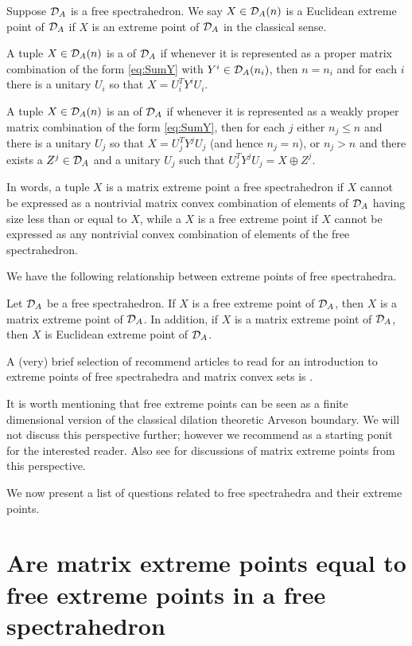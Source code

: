 Suppose $\mathcal{D}_A$ is a free spectrahedron. We say $X \in \mathcal{D}_A (n)$ is a Euclidean extreme point of $\mathcal{D}_A$ if $X$ is an extreme point of 
$\mathcal{D}_A$ in the classical sense. 

A tuple  $X \in \mathcal{D}_A(n)$  is a 
  of $\mathcal{D}_A$
 if whenever it is represented as a proper matrix combination of the form
\eqref{eq:SumY} with $Y^i \in \mathcal{D}_A(n_i)$,
then $n=n_i$ and for each $i$ there is a unitary $U_i$ so that  $X = U_i^T Y^i U_i$.

 A tuple  $X \in \mathcal{D}_A(n)$  is an    of $\mathcal{D}_A$
 if whenever it is represented as a weakly proper matrix combination of the form \eqref{eq:SumY},  then
  for each $j$ either $n_j \leq n$ and there is a unitary $U_j$ so that  $X = U_j^T Y^j U_j$ (and hence $n_j=n$),
 or $n_j>n$ and there exists a $Z^j  \in \mathcal{D}_A$ and a unitary $U_j$  such that $U_j^T Y^j U_j =  X\oplus Z^j$.
 
 In words, a tuple $X$ is a matrix extreme point a free spectrahedron if $X$ cannot be expressed as a nontrivial matrix convex combination of 
 elements of $\mathcal{D}_A$ having size less than or equal to $X$, while a $X$ is a free extreme point if $X$ cannot be expressed as any nontrivial 
 convex combination of elements of the free spectrahedron. 
 
 We have the following relationship between extreme points of free spectrahedra.
 \begin{theorem}
 Let $\mathcal{D}_A$ be a free spectrahedron. If $X$ is a free extreme point of $\mathcal{D}_A$, then $X$ is a matrix extreme point of $\mathcal{D}_A$. In addition, 
 if $X$ is a matrix extreme point of $\mathcal{D}_A$, then $X$ is Euclidean extreme point of $\mathcal{D}_A$. 
 \end{theorem}
 
 A (very) brief selection of recommend articles to read for an introduction to extreme points of free spectrahedra and matrix convex sets is 
 \cite{WW99,EHKM18,EH19}.
 
It is worth mentioning that free extreme points can be seen as a finite dimensional version of the classical dilation theoretic Arveson 
boundary. We will not discuss this perspective further; however we recommend \cite{A69,DK15,DK+} as a starting ponit for the interested 
reader. Also see \cite{F00,F04} for discussions of matrix extreme points from this perspective.
 
 We now present a list of questions related to free spectrahedra and their extreme points.

\section{Are matrix extreme points equal to free extreme points in a free spectrahedron}
\label{sec:MatExtreme}

